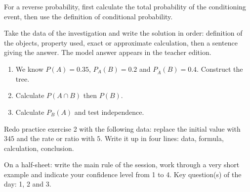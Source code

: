     \begin{traceecrite}For a reverse probability, first calculate the total probability of the conditioning event, then use the definition of conditional probability.\end{traceecrite}

    \begin{exemple}
    Take the data of the investigation and write the solution in order: definition of the objects, property used, exact or approximate calculation, then a sentence giving the answer. The model answer appears in the teacher edition.
    \end{exemple}

    \begin{exercice}[-- essential]
    \begin{enumerate}\item We know $P(A)=0.35$, $P_A(B)=0.2$ and $P_{\overline A}(B)=0.4$. Construct the tree.\item Calculate $P(A\cap B)$ then $P(B)$.\item Calculate $P_B(A)$ and test independence.\end{enumerate}
    \end{exercice}


    \begin{dm}Redo practice exercise 2 with the following data: replace the initial value with $345$ and the rate or ratio with $5$. Write it up in four lines: data, formula, calculation, conclusion.\end{dm}

    \begin{sortie}On a half-sheet: write the main rule of the session, work through a very short example and indicate your confidence level from 1 to 4. Key question(s) of the day: 1, 2 and 3.\end{sortie}

